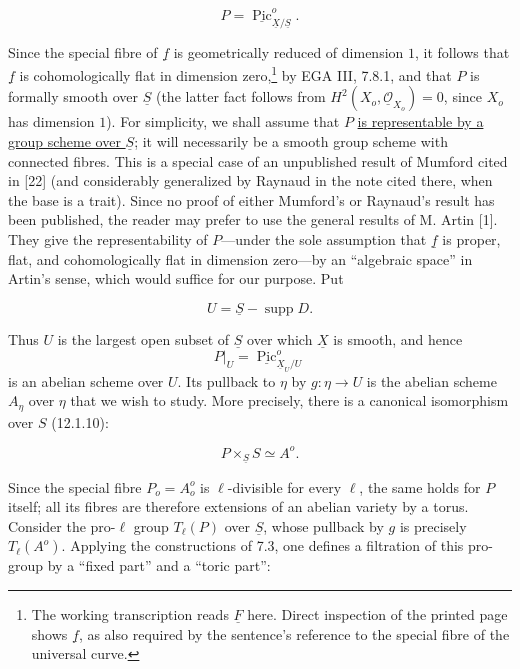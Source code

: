 \begin{equation}\tag{12.8.3}
 P=\underline{\operatorname{Pic}}^{o}_{\underline X/\underline S}.
\end{equation}

\noindent
Since the special fibre of $\underline f$ is geometrically reduced of
dimension $1$, it follows that $\underline f$ is cohomologically flat in
dimension zero,\footnote{The working transcription reads $\underline F$
here. Direct inspection of the printed page shows $\underline f$, as also
required by the sentence's reference to the special fibre of the universal
curve.} by EGA III, 7.8.1, and that $P$ is formally smooth over
$\underline S$ (the latter fact follows from
$H^2(X_o,\underline{\mathcal O}_{X_o})=0$, since $X_o$ has dimension $1$).
For simplicity, we shall assume that $P$ \underline{is representable by a
group scheme over $\underline S$}; it will necessarily be a smooth group
scheme with connected fibres. This is a special case of an unpublished
result of Mumford cited in [22] (and considerably generalized by Raynaud in
the note cited there, when the base is a trait). Since no proof of either
Mumford's or Raynaud's result has been published, the reader may prefer to
use the general results of M. Artin [1]. They give the representability of
$P$---under the sole assumption that $\underline f$ is proper, flat, and
cohomologically flat in dimension zero---by an ``algebraic space'' in
Artin's sense, which would suffice for our purpose. Put

\begin{equation}\tag{12.8.4}
 U=\underline S-\operatorname{supp}D.
\end{equation}

\noindent
Thus $U$ is the largest open subset of $\underline S$ over which
$\underline X$ is smooth, and hence
\[
 P|_U=\underline{\operatorname{Pic}}^{o}_{\underline X_U/U}
\]
is an abelian scheme over $U$. Its pullback to $\eta$ by
$g:\eta\longrightarrow U$ is the abelian scheme $A_\eta$ over $\eta$ that
we wish to study. More precisely, there is a canonical isomorphism over
$S$ (12.1.10):

\begin{equation}\tag{12.8.5}
 P\times_{\underline S}S\simeq A^{o}.
\end{equation}

\noindent
Since the special fibre $P_o=A_o^{o}$ is $\ell$-divisible for every
$\ell$, the same holds for $P$ itself; all its fibres are therefore
extensions of an abelian variety by a torus. Consider the pro-$\ell$ group
$T_\ell(P)$ over $\underline S$, whose pullback by $g$ is precisely
$T_\ell(A^{o})$. Applying the constructions of 7.3, one defines a
filtration of this pro-group by a ``fixed part'' and a ``toric part'':

